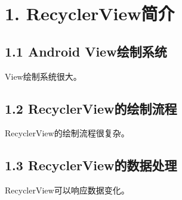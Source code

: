 \chapter{1. RecyclerView简介}
\section{1.1 Android View绘制系统}
View绘制系统很大。
\section{1.2 RecyclerView的绘制流程}
RecyclerView的绘制流程很复杂。
\section{1.3 RecyclerView的数据处理}
RecyclerView可以响应数据变化。